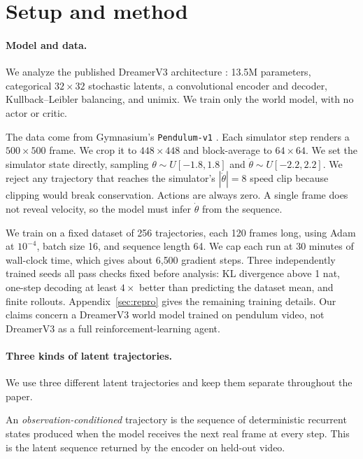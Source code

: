 \section{Setup and method}
\label{sec:setup}

\paragraph{Model and data.} We analyze the published DreamerV3 architecture
\citep{hafner2023dreamerv3}: 13.5M parameters, categorical $32\times32$ stochastic latents, a
convolutional encoder and decoder, Kullback--Leibler balancing, and unimix. We train only the world
model, with no actor or critic.

The data come from Gymnasium's \texttt{Pendulum-v1} \citep{towers2024gymnasium}. Each simulator step
renders a $500\times500$ frame. We crop it to $448\times448$ and block-average to $64\times64$. We
set the simulator state directly, sampling $\theta\sim U[-1.8,1.8]$ and
$\dot\theta\sim U[-2.2,2.2]$. We reject any trajectory that reaches the simulator's $|\dot\theta|=8$
speed clip because clipping would break conservation. Actions are always zero. A single frame does
not reveal velocity, so the model must infer $\dot\theta$ from the sequence.

We train on a fixed dataset of 256 trajectories, each 120 frames long, using Adam at $10^{-4}$,
batch size 16, and sequence length 64. We cap each run at 30 minutes of wall-clock time, which gives
about 6{,}500 gradient steps. Three independently trained seeds all pass checks fixed before
analysis: KL divergence above 1 nat, one-step decoding at least $4\times$ better than predicting the
dataset mean, and finite rollouts. Appendix~\ref{sec:repro} gives the remaining training details.
Our claims concern a DreamerV3 world model trained on pendulum video, not DreamerV3 as a full
reinforcement-learning agent.

\paragraph{Three kinds of latent trajectories.} We use three different latent trajectories and keep
them separate throughout the paper.

An \emph{observation-conditioned} trajectory is the sequence of deterministic recurrent states
produced when the model receives the next real frame at every step. This is the latent sequence
returned by the encoder on held-out video.

